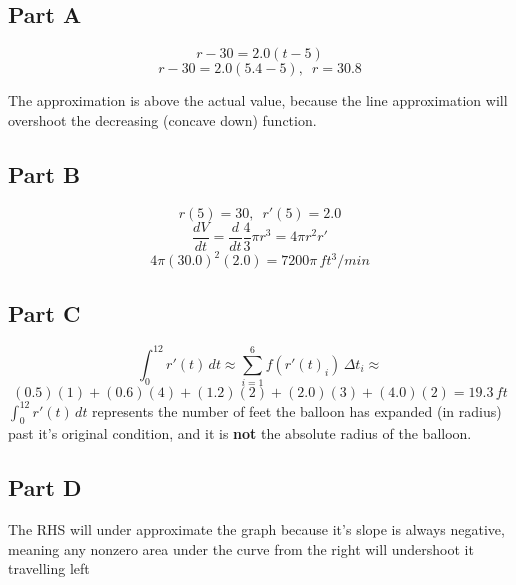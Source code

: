 \subsection{Part A}
\[ r - 30 = 2.0(t - 5) \]
\[ r - 30 = 2.0(5.4 - 5), \enspace r = 30.8 \]
\begin{center}
\end{center}
The approximation is above the actual value, because the line approximation will overshoot the decreasing (concave down) function.

\subsection{Part B}
\[ r(5) = 30, \enspace r'(5) = 2.0 \]
\[ \frac{dV}{dt} = \frac{d}{dt} \frac{4}{3}\pi r^3 = 4 \pi r^2 r' \]
\[ 4 \pi (30.0)^2(2.0) = 7200\pi \, ft^3/min \]

\subsection{Part C}
\[ \int_{0}^{12} r'(t)\,dt \approx \sum _{i=1}^{6}f(r'(t)_{i})\,\Delta t_{i} \approx \]
\[ (0.5)(1) + (0.6)(4) + (1.2)(2) + (2.0)(3) + (4.0)(2) = 19.3 \, ft\]
\underline{$\int_{0}^{12} r'(t)\,dt$} represents the number of feet the balloon has expanded (in radius) past it's original condition, and it is \textbf{not} the absolute radius of the balloon.

\subsection{Part D}
\begin{center}
\end{center}

The RHS will under approximate the graph because it's slope is always negative, meaning any nonzero area under the curve from the right will undershoot it travelling left
